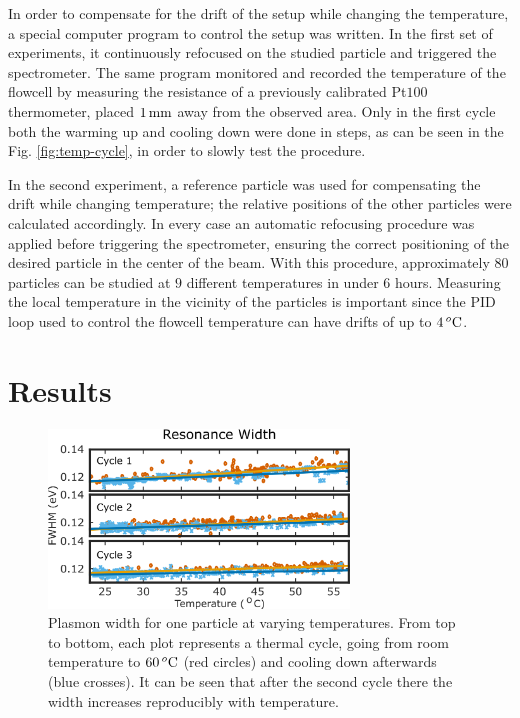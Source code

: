 In order to compensate for the drift of the setup while changing the
temperature, a special computer program to control the setup was written. In the
first set of experiments, it continuously refocused on the studied particle and
triggered the spectrometer. The same program monitored and recorded the
temperature of the flowcell by measuring the resistance of a previously
calibrated Pt$100$ thermometer, placed $1\,\textrm{mm}$ away from the observed area. Only
in the first cycle both the warming up and cooling down were done in steps, as
can be seen in the Fig. \ref{fig:temp-cycle}, in order to slowly test the
procedure.

In the second experiment, a reference particle was used for compensating the
drift while changing temperature; the relative positions of the other particles
were calculated accordingly. In every case an automatic refocusing procedure was
applied before triggering the spectrometer, ensuring the correct positioning of
the desired particle in the center of the beam. With this procedure,
approximately $80$ particles can be studied at $9$ different temperatures in
under $6$ hours. Measuring the local temperature in the vicinity of the
particles is important since the PID loop used to control the flowcell
temperature can have drifts of up to $4\,^o\textrm{C}$.

\section{Results}
\begin{figure}[tp] \centering
\includegraphics[width=80mm]{Chapters/05_WhiteLight/Figures/02_One_Pcle/02_One_Pcle.png}
\caption{Plasmon width for one particle at varying temperatures. From top to
bottom, each plot represents a thermal cycle, going from room temperature to
$60\,^o\textrm{C}$ (red circles) and cooling down afterwards (blue crosses). It can be
seen that after the second cycle there the width increases reproducibly with
temperature.}
	\label{fig:one_pcle}
\end{figure}


